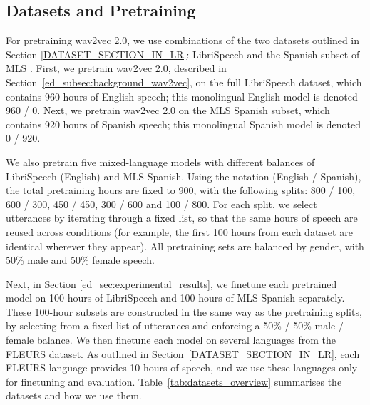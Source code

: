 \subsection{Datasets and Pretraining}\label{ed_subsec:datsets}
For pretraining wav2vec 2.0, we use combinations of the two datasets outlined in Section \ref{DATASET_SECTION_IN_LR}: LibriSpeech \cite{librispeech} and the Spanish subset of MLS \cite{MLS}. First, we pretrain wav2vec 2.0, described in Section~\ref{ed_subsec:background_wav2vec}, on the full LibriSpeech dataset, which contains 960 hours of English speech; this monolingual English model is denoted 960 / 0. Next, we pretrain wav2vec 2.0 on the MLS Spanish subset, which contains 920 hours of Spanish speech; this monolingual Spanish model is denoted 0 / 920.

We also pretrain five mixed-language models with different balances of LibriSpeech (English) and MLS Spanish. Using the notation (English / Spanish), the total pretraining hours are fixed to 900, with the following splits: 800 / 100, 600 / 300, 450 / 450, 300 / 600 and 100 / 800. For each split, we select utterances by iterating through a fixed list, so that the same hours of speech are reused across conditions (for example, the first 100 hours from each dataset are identical wherever they appear). All pretraining sets are balanced by gender, with 50\% male and 50\% female speech.

Next, in Section \ref{ed_sec:experimental_results}, we finetune each pretrained model on 100 hours of LibriSpeech and 100 hours of MLS Spanish separately. These 100-hour subsets are constructed in the same way as the pretraining splits, by selecting from a fixed list of utterances and enforcing a 50\% / 50\% male / female balance. We then finetune each model on several languages from the FLEURS dataset. As outlined in Section~\ref{DATASET_SECTION_IN_LR}, each FLEURS language provides 10 hours of speech, and we use these languages only for finetuning and evaluation. Table~\ref{tab:datasets_overview} summarises the datasets and how we use them.

